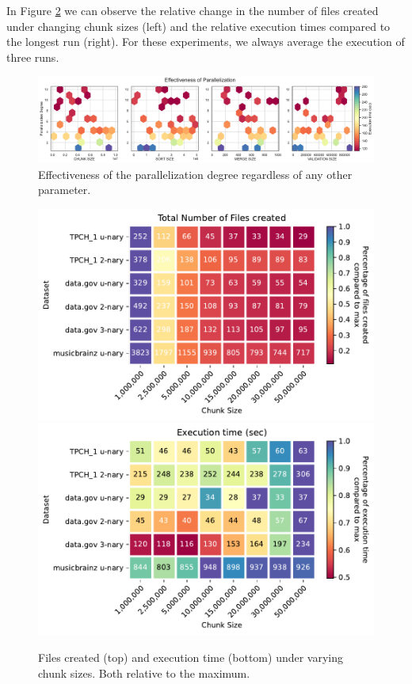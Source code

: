In Figure \ref{fig:chunk_size} we can observe the relative change in the number of files created under changing chunk sizes (left) and the relative execution times compared to the longest run (right). For these experiments, we always average the execution of three runs.

\begin{figure}
    \centering
    \includegraphics[width=.47\textwidth]{figures/parallelization.pdf}
    \caption{Effectiveness of the parallelization degree regardless of any other parameter.}
    \label{fig:parallelization_effectivness}
\end{figure}

\begin{figure}
    \centering
    \includegraphics[width=.47\textwidth]{figures/chunk_size_files_created.pdf}
    \includegraphics[width=.47\textwidth]{figures/chunk_size_execution_time.pdf}
    \caption{Files created (top) and execution time (bottom) under varying chunk sizes. Both relative to the maximum.}
    \label{fig:chunk_size}
\end{figure}